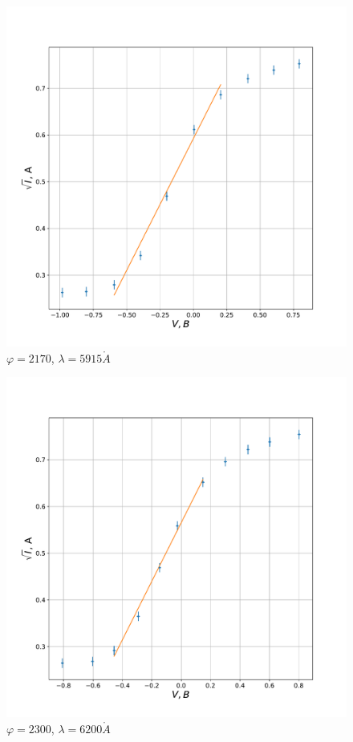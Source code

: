 \documentclass[a4paper, 12pt]{article}
\renewcommand{\phi}{\varphi}
\renewcommand{\AA}{\ensuremath{\mathring{A}}}
\begin{document}
\begin{figure}[H]
    \centering
    \includegraphics[scale=0.5]{2170}
    \caption {$\phi = 2170$, $\lambda = 5915 \AA$}
\end{figure}

\begin{figure}[H]
    \centering
    \includegraphics[scale=0.5]{2300}
    \caption {$\phi = 2300$, $\lambda = 6200 \AA$}
\end{figure}
\end{document}
